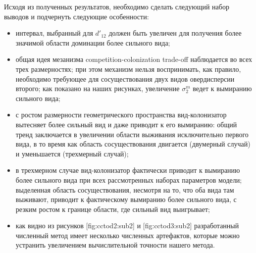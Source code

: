 Исходя из полученных результатов, необходимо сделать следующий набор выводов и подчернуть следующие особенности:

\begin{itemize}
	\item интервал, выбранный для $ d'_{12} $ должен быть увеличен для получения более значимой области доминации более сильного вида; 
	
	\item общая идея мезанизма competition-colonization trade-off наблюдается во всех трех размерностях; при этом механизм нельзя воспринимать, как правило, необходимо требующее для сосуществования двух видов овердисперсии второго; как показано на наших рисунках, увеличение $ \sigma_{2}^{m} $ ведет к вымиранию сильного вида; 
	
	\item с ростом размерности геометрического пространства вид-колонизатор вытесняет более сильный вид и даже приводит к его вымиранию: общий тренд заключается в увеличении области выживания исключительно первого вида, в то время как область сосуществования двигается (двумерный случай) и уменьшается (трехмерный случай); 
	
	\item в трехмерном случае вид-колонизатор фактически приводит к вымиранию более сильного вида при всех рассмотренных наборах параметров модели; выделенная область сосуществования, несмотря на то, что оба вида там выживают, приводит к фактическому вымиранию более сильного вида, с резким ростом к границе области, где сильный вид выигрывает;
	
	\item как видно из рисунков [fig:cctod2:sub2] и [fig:cctod3:sub2] разработанный численный метод имеет несколько численных артефактов, которые можно устранить увеличением вычислительной точности нашего метода.
\end{itemize}

